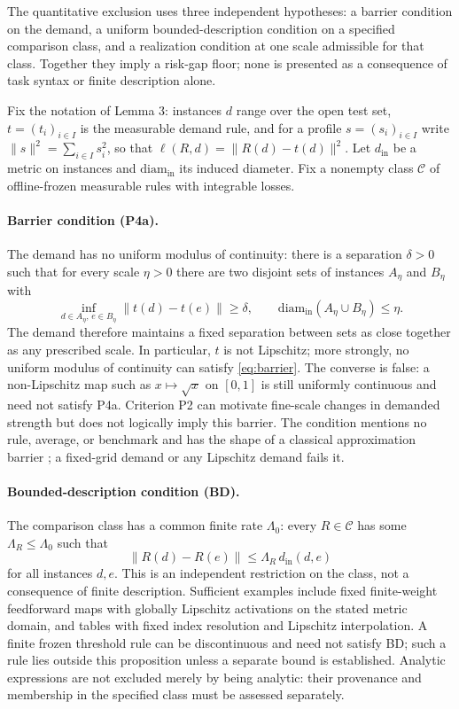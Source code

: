 \documentclass[twoside,11pt]{article}
\begin{document}
The quantitative exclusion uses three independent hypotheses: a barrier condition on the demand, a uniform bounded-description condition on a specified comparison class, and a realization condition at one scale admissible for that class. Together they imply a risk-gap floor; none is presented as a consequence of task syntax or finite description alone.

Fix the notation of Lemma 3: instances $d$ range over the open test set, $t=(t_i)_{i\in I}$ is the measurable demand rule, and for a profile $s=(s_i)_{i\in I}$ write $\|s\|^2=\sum_{i\in I}s_i^2$, so that $\ell(R,d)=\|R(d)-t(d)\|^2$. Let $d_{\mathrm{in}}$ be a metric on instances and $\mathrm{diam}_{\mathrm{in}}$ its induced diameter. Fix a nonempty class $\mathcal{C}$ of offline-frozen measurable rules with integrable losses.

\paragraph{Barrier condition (P4a).} The demand has no uniform modulus of continuity: there is a separation $\delta>0$ such that for every scale $\eta>0$ there are two disjoint sets of instances $A_\eta$ and $B_\eta$ with
\begin{equation}
\inf_{d\in A_\eta,\,e\in B_\eta}\|t(d)-t(e)\|\geq\delta, \qquad \mathrm{diam}_{\mathrm{in}}(A_\eta\cup B_\eta)\leq\eta .
\label{eq:barrier}%
\end{equation}%
The demand therefore maintains a fixed separation between sets as close together as any prescribed scale. In particular, $t$ is not Lipschitz; more strongly, no uniform modulus of continuity can satisfy \eqref{eq:barrier}. The converse is false: a non-Lipschitz map such as $x\mapsto\sqrt{x}$ on $[0,1]$ is still uniformly continuous and need not satisfy P4a. Criterion P2 can motivate fine-scale changes in demanded strength but does not logically imply this barrier. The condition mentions no rule, average, or benchmark and has the shape of a classical approximation barrier \citep{kolmogorov1936,pinkus1985}; a fixed-grid demand or any Lipschitz demand fails it.

\paragraph{Bounded-description condition (BD).} The comparison class has a common finite rate $\Lambda_0$: every $R\in\mathcal{C}$ has some $\Lambda_R\leq\Lambda_0$ such that
\begin{equation}
\|R(d)-R(e)\|\leq\Lambda_R\,d_{\mathrm{in}}(d,e)
\label{eq:rate}%
\end{equation}%
for all instances $d,e$. This is an independent restriction on the class, not a consequence of finite description. Sufficient examples include fixed finite-weight feedforward maps with globally Lipschitz activations on the stated metric domain, and tables with fixed index resolution and Lipschitz interpolation. A finite frozen threshold rule can be discontinuous and need not satisfy BD; such a rule lies outside this proposition unless a separate bound is established. Analytic expressions are not excluded merely by being analytic: their provenance and membership in the specified class must be assessed separately.
\end{document}
